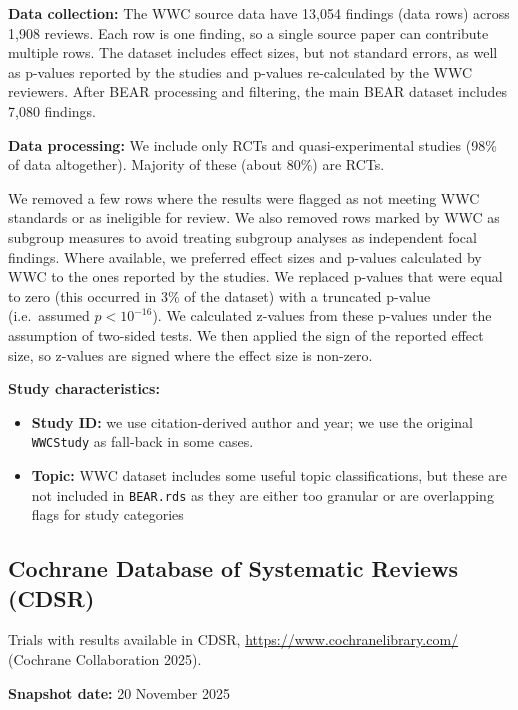 \documentclass[
  11pt,
]{article}
\providecommand{\tightlist}{%
  \setlength{\itemsep}{0pt}\setlength{\parskip}{0pt}}
\begin{document}
\textbf{Data collection:} The WWC source data have 13,054 findings (data
rows) across 1,908 reviews. Each row is one finding, so a single source
paper can contribute multiple rows. The dataset includes effect sizes,
but not standard errors, as well as p-values reported by the studies and
p-values re-calculated by the WWC reviewers. After BEAR processing and
filtering, the main BEAR dataset includes 7,080 findings.

\textbf{Data processing:} We include only RCTs and quasi-experimental
studies (98\% of data altogether). Majority of these (about 80\%) are
RCTs.

We removed a few rows where the results were flagged as not meeting WWC
standards or as ineligible for review. We also removed rows marked by
WWC as subgroup measures to avoid treating subgroup analyses as
independent focal findings. Where available, we preferred effect sizes
and p-values calculated by WWC to the ones reported by the studies. We
replaced p-values that were equal to zero (this occurred in 3\% of the
dataset) with a truncated p-value (i.e.~assumed \(p < 10^{-16}\)). We
calculated z-values from these p-values under the assumption of
two-sided tests. We then applied the sign of the reported effect size,
so z-values are signed where the effect size is non-zero.

\textbf{Study characteristics:}

\begin{itemize}
\tightlist
\item
  \textbf{Study ID:} we use citation-derived author and year; we use the
  original \texttt{WWCStudy} as fall-back in some cases.
\item
  \textbf{Topic:} WWC dataset includes some useful topic
  classifications, but these are not included in \texttt{BEAR.rds} as
  they are either too granular or are overlapping flags for study
  categories
\end{itemize}

\newpage

\subsection{Cochrane Database of Systematic Reviews
(CDSR)}\label{cochrane-database-of-systematic-reviews-cdsr}

Trials with results available in CDSR,
\url{https://www.cochranelibrary.com/} (Cochrane Collaboration 2025).

\textbf{Snapshot date:} 20 November 2025
\end{document}
